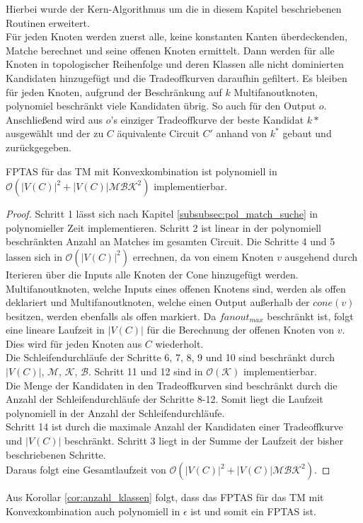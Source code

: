 \documentclass[11pt, a4paper, german]{article}
\begin{document}
Hierbei wurde der Kern-Algorithmus um die in diesem Kapitel beschriebenen Routinen erweitert. \\
Für jeden Knoten werden zuerst alle, keine konstanten Kanten überdeckenden, Matche berechnet und seine offenen Knoten ermittelt. Dann werden für alle Knoten in topologischer Reihenfolge und deren Klassen alle nicht dominierten Kandidaten hinzugefügt und die Tradeoffkurven daraufhin gefiltert. Es bleiben für jeden Knoten, aufgrund der Beschränkung auf $k$ Multifanoutknoten, polynomiel beschränkt viele Kandidaten übrig. So auch für den Output $o$. Anschließend wird aus $o$'s einziger Tradeoffkurve der beste Kandidat $k*$ ausgewählt und der zu $C$ äquivalente Circuit $C'$ anhand von $k^*$ gebaut und zurückgegeben.

\begin{lemma}
	FPTAS für das TM mit Konvexkombination ist polynomiell in $\mathcal{O}(|V(C)|^2 + |V(C)|\mathcal{MBK}^2)$ implementierbar.
\end{lemma}
\begin{proof}
Schritt 1 lässt sich nach Kapitel \ref{subsubsec:pol_match_suche} in polynomieller Zeit implementieren. Schritt 2 ist linear in der polynomiell beschränkten Anzahl an Matches im gesamten Circuit.  Die Schritte 4 und  5 lassen sich in $\mathcal{O}(|V(C)|^2)$ errechnen, da von einem Knoten $v$ ausgehend durch Iterieren über die Inputs alle Knoten der Cone hinzugefügt werden.  Multifanoutknoten, welche Inputs eines offenen Knotens sind, werden als offen deklariert und Multifanoutknoten, welche einen Output außerhalb der $cone(v)$ besitzen, werden ebenfalls als offen markiert. Da $fanout_{max}$ beschränkt ist, folgt eine lineare Laufzeit in $|V(C)|$ für die Berechnung der offenen Knoten von $v$. Dies wird für jeden Knoten aus $C$ wiederholt. \\
Die  Schleifendurchläufe der Schritte 6, 7, 8, 9  und 10 sind beschränkt durch $|V(C)|$, $\mathcal{M}$,  $\mathcal{K}$, $\mathcal{B}$. Schritt 11 und 12 sind in $\mathcal{O}(\mathcal{K})$ implementierbar.\\
Die Menge der Kandidaten in den Tradeoffkurven sind beschränkt durch die Anzahl der Schleifendurchläufe der Schritte 8-12.  Somit liegt die Laufzeit polynomiell in der Anzahl der Schleifendurchläufe. \\
Schritt 14 ist durch die maximale Anzahl der Kandidaten einer Tradeoffkurve und $|V(C)|$ beschränkt. Schritt 3 liegt in der Summe der Laufzeit der bisher beschriebenen Schritte.\\
Daraus folgt eine Gesamtlaufzeit von $\mathcal{O}(|V(C)|^2 + |V(C)|\mathcal{MBK}^2)$.
\end{proof}
Aus Korollar \ref{cor:anzahl_klassen} folgt, dass das FPTAS für das TM mit Konvexkombination  auch polynomiell in $\epsilon$ ist und somit ein FPTAS ist. 
\end{document}
